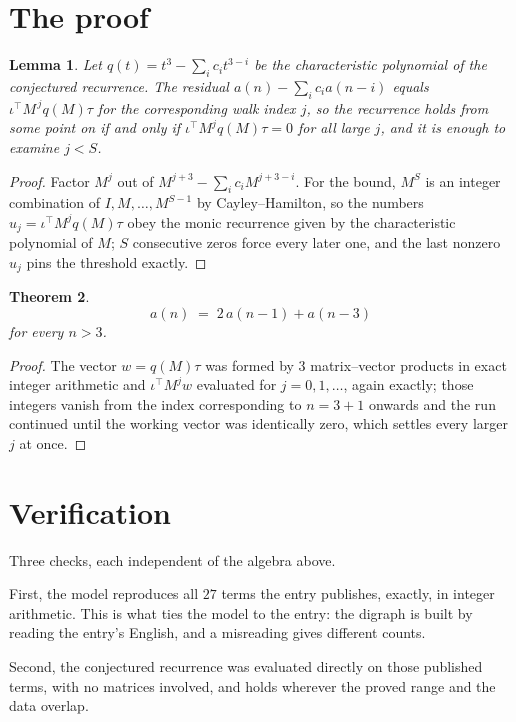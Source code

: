 \documentclass[11pt,a4paper]{article}
\theoremstyle{plain}
\newtheorem{theorem}{Theorem}
\newtheorem{lemma}[theorem]{Lemma}
\theoremstyle{definition}
\begin{document}
\section{The proof}

\begin{lemma}\label{lem:crit}
Let $q(t)=t^{3}-\sum_i c_it^{3-i}$ be the characteristic polynomial of the
conjectured recurrence. The residual $a(n)-\sum_ic_ia(n-i)$ equals
$\iota^{\!\top}M^{\,j}q(M)\tau$ for the corresponding walk index $j$, so the recurrence
holds from some point on if and only if $\iota^{\!\top}M^{j}q(M)\tau=0$ for all large $j$,
and it is enough to examine $j<S$.
\end{lemma}

\begin{proof}
Factor $M^{j}$ out of $M^{j+3}-\sum_ic_iM^{j+3-i}$. For the bound, $M^{S}$
is an integer combination of $I,M,\dots,M^{S-1}$ by Cayley--Hamilton, so the numbers
$u_j=\iota^{\!\top}M^{j}q(M)\tau$ obey the monic recurrence given by the characteristic
polynomial of $M$; $S$ consecutive zeros force every later one, and the last nonzero $u_j$
pins the threshold exactly.
\end{proof}

\begin{theorem}
\[
a(n)\;=\;2\,a(n-1) + a(n-3)
\]
for every $n>3$.
\end{theorem}

\begin{proof}
The vector $w=q(M)\tau$ was formed by $3$ matrix--vector products in exact integer
arithmetic and $\iota^{\!\top}M^{j}w$ evaluated for $j=0,1,\dots$, again exactly; those
integers vanish from the index corresponding to $n=3+1$ onwards and the run continued
until the working vector was identically zero, which settles every larger $j$ at once.
\end{proof}

\section{Verification}

Three checks, each independent of the algebra above.

First, the model reproduces all $27$ terms the entry publishes, exactly, in integer
arithmetic. This is what ties the model to the entry: the digraph is built by reading the
entry's English, and a misreading gives different counts.

Second, the conjectured recurrence was evaluated directly on those published terms, with no
matrices involved, and holds wherever the proved range and the data overlap.
\end{document}
